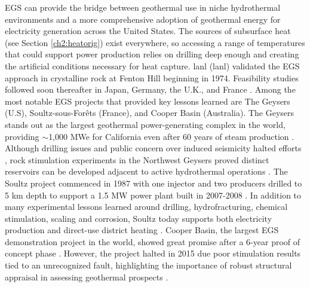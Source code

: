 EGS can provide the bridge between geothermal use in niche hydrothermal environments and a more comprehensive adoption of geothermal energy for electricity generation across the United States. The sources of subsurface heat (see Section \ref{ch2:heatorig}) exist everywhere, so accessing a range of temperatures that could support power production relies on drilling deep enough and creating the artificial conditions necessary for heat capture. \acrlong{lanl} (\acrshort{lanl}) validated the EGS approach in crystalline rock at Fenton Hill beginning in 1974. Feasibility studies followed soon thereafter in Japan, Germany, the U.K., and France \citep{breede_systematic_2013}. Among the most notable EGS projects that provided key lessons learned are The Geysers (U.S), Soultz-sous-Forêts (France), and Cooper Basin (Australia). The Geysers stands out as the largest geothermal power-generating complex in the world, providing $\sim$1,000 MWe for California even after 60 years of steam production \citep{jelacic_evaluation_2008,williams_assessment_2008}. Although drilling issues and public concern over induced seismicity halted efforts \citep{manish03_united_2009}, rock stimulation experiments in the Northwest Geysers proved distinct reservoirs can be developed adjacent to active hydrothermal operations \citep{pan_establishment_2019}. The Soultz project commenced in 1987 with one injector and two producers drilled to 5 km depth to support a 1.5 MW power plant built in 2007-2008 \citep[~p. 463]{dipippo_geothermal_2012}. In addition to many experimental lessons learned around drilling, hydrofracturing, chemical stimulation, scaling and corrosion, Soultz today supports both electricity production and direct-use district heating \citep{durst_overview_2013}. Cooper Basin, the largest EGS demonstration project in the world, showed great promise after a 6-year proof of concept phase \citep{stephens_assessing_2010}. However, the project halted in 2015 due poor stimulation results tied to an unrecognized fault, highlighting the importance of robust structural appraisal in assessing geothermal prospects \citep{holl_what_2015}. 

